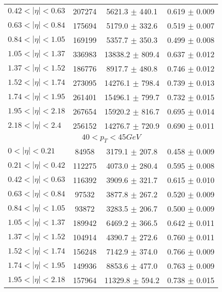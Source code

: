 \begin{tabular}{lccc}
$0.42 < |\eta| <0.63$          & 207274     & 5621.3     $\pm$ 440.1 & 0.619      $\pm$ 0.009 \\
$0.63 < |\eta| <0.84$          & 175694     & 5179.0     $\pm$ 332.6 & 0.519      $\pm$ 0.007 \\
$0.84 < |\eta| <1.05$          & 169199     & 5357.7     $\pm$ 350.3 & 0.499      $\pm$ 0.008 \\
$1.05 < |\eta| <1.37$          & 336983     & 13838.2    $\pm$ 809.4 & 0.637      $\pm$ 0.012 \\
$1.37 < |\eta| <1.52$          & 186776     & 8917.7     $\pm$ 480.8 & 0.746      $\pm$ 0.012 \\
$1.52 < |\eta| <1.74$          & 273095     & 14276.1    $\pm$ 798.4 & 0.739      $\pm$ 0.013 \\
$1.74 < |\eta| <1.95$          & 261401     & 15496.1    $\pm$ 799.7 & 0.732      $\pm$ 0.015 \\
$1.95 < |\eta| <2.18$          & 267654     & 15920.2    $\pm$ 816.7 & 0.695      $\pm$ 0.014 \\
$2.18 < |\eta| <2.4$           & 256152     & 14276.7    $\pm$ 720.9 & 0.690      $\pm$ 0.011 \\
\hline
\multicolumn{4}{c}{$40 < p_{T} < 45 GeV$} \\
\hline
$0 < |\eta| <0.21$             & 84958      & 3179.1     $\pm$ 207.8 & 0.458      $\pm$ 0.009 \\
$0.21 < |\eta| <0.42$          & 112275     & 4073.0     $\pm$ 280.4 & 0.595      $\pm$ 0.008 \\
$0.42 < |\eta| <0.63$          & 116392     & 3909.6     $\pm$ 321.7 & 0.615      $\pm$ 0.010 \\
$0.63 < |\eta| <0.84$          & 97532      & 3877.8     $\pm$ 267.2 & 0.520      $\pm$ 0.009 \\
$0.84 < |\eta| <1.05$          & 93872      & 3283.5     $\pm$ 206.7 & 0.500      $\pm$ 0.009 \\
$1.05 < |\eta| <1.37$          & 189942     & 6469.2     $\pm$ 366.5 & 0.642      $\pm$ 0.011 \\
$1.37 < |\eta| <1.52$          & 104914     & 4390.7     $\pm$ 272.6 & 0.760      $\pm$ 0.011 \\
$1.52 < |\eta| <1.74$          & 156248     & 7142.9     $\pm$ 374.0 & 0.766      $\pm$ 0.009 \\
$1.74 < |\eta| <1.95$          & 149936     & 8853.6     $\pm$ 477.0 & 0.763      $\pm$ 0.009 \\
$1.95 < |\eta| <2.18$          & 157964     & 11329.8    $\pm$ 594.2 & 0.738      $\pm$ 0.015 \\

\end{tabular}
